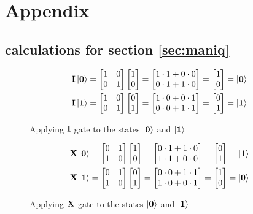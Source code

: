 \section{Appendix}
\subsection{calculations for section \ref{sec:maniq}} \label{app:maniq}
\begin{figure}[H]
    \centering
    \begin{align*}
        \mathbf{I}\ket{\mathbf{0}}&=\begin{bmatrix} 1 & 0\\ 0 & 1\\ \end{bmatrix}\begin{bmatrix} 1\\ 0\\ \end{bmatrix}=
        \begin{bmatrix}
            1 \cdot 1 + 0 \cdot 0\\
            0 \cdot 1 + 1 \cdot 0\\
        \end{bmatrix}=
        \begin{bmatrix} 1\\ 0\\ \end{bmatrix}=\ket{\mathbf{0}}\\
        \mathbf{I}\ket{\mathbf{1}}&=\begin{bmatrix} 1 & 0\\ 0 & 1\\ \end{bmatrix}\begin{bmatrix} 0\\ 1\\ \end{bmatrix}=
        \begin{bmatrix}
            1 \cdot 0 + 0 \cdot 1\\
            0 \cdot 0 + 1 \cdot 1\\
        \end{bmatrix}=
        \begin{bmatrix} 0\\ 1\\ \end{bmatrix}=\ket{\mathbf{1}}
    \end{align*}
    \caption{Applying $\mathbf{I}$ gate to the states $\ket{\mathbf{0}}$ and $\ket{\mathbf{1}}$}
    \label{fig:app_i}
\end{figure}

\begin{figure}[H]
    \centering
    \begin{align*}
        \mathbf{X}\ket{\mathbf{0}}&=\begin{bmatrix} 0 & 1\\ 1 & 0\\ \end{bmatrix}\begin{bmatrix} 1\\ 0\\ \end{bmatrix}=
        \begin{bmatrix}
            0 \cdot 1 + 1 \cdot 0\\
            1 \cdot 1 + 0 \cdot 0\\
        \end{bmatrix}=
        \begin{bmatrix} 0\\ 1\\ \end{bmatrix}=\ket{\mathbf{1}}\\
        \mathbf{X}\ket{\mathbf{1}}&=\begin{bmatrix} 0 & 1\\ 1 & 0\\ \end{bmatrix}\begin{bmatrix} 0\\ 1\\ \end{bmatrix}=
        \begin{bmatrix}
            0 \cdot 0 + 1 \cdot 1\\
            1 \cdot 0 + 0 \cdot 1\\
        \end{bmatrix}=
        \begin{bmatrix} 1\\ 0\\ \end{bmatrix}=\ket{\mathbf{0}}
    \end{align*}
    \caption{Applying $\mathbf{X}$ gate to the states $\ket{\mathbf{0}}$ and $\ket{\mathbf{1}}$}
    \label{fig:app_x}
\end{figure}

